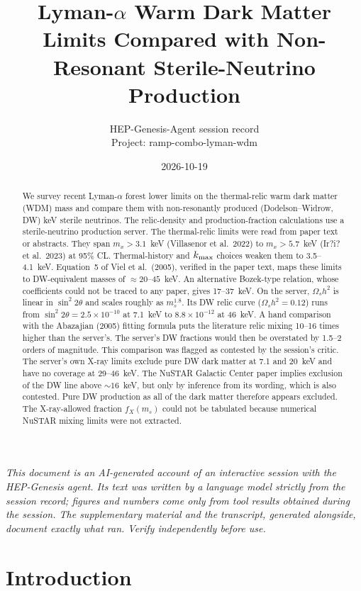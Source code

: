 \documentclass[11pt,a4paper]{article}
\title{Lyman-$\alpha$ Warm Dark Matter Limits Compared with Non-Resonant Sterile-Neutrino Production}
\author{HEP-Genesis-Agent session record \\ \small Project: ramp-combo-lyman-wdm}
\date{2026-10-19}
\begin{document}
\maketitle
\noindent\textit{\small This document is an AI-generated account of an interactive session with the HEP-Genesis agent. Its text was written by a language model strictly from the session record; figures and numbers come only from tool results obtained during the session. The supplementary material and the transcript, generated alongside, document exactly what ran. Verify independently before use.}
\vspace{1em}

\begin{abstract}
We survey recent Lyman-$\alpha$ forest lower limits on the thermal-relic warm dark matter (WDM) mass and compare them with non-resonantly produced (Dodelson--Widrow, DW) keV sterile neutrinos. The relic-density and production-fraction calculations use a sterile-neutrino production server. The thermal-relic limits were read from paper text or abstracts. They span $m_x>3.1$~keV (Villasenor et al.\ 2022) to $m_x>5.7$~keV (Ir?i? et al.\ 2023) at 95\% CL. Thermal-history and $k_{\rm max}$ choices weaken them to 3.5--4.1~keV. Equation~5 of Viel et al.\ (2005), verified in the paper text, maps these limits to DW-equivalent masses of $\approx 20$--$45$~keV. An alternative Bozek-type relation, whose coefficients could not be traced to any paper, gives 17--37~keV. On the server, $\Omega_s h^2$ is linear in $\sin^2 2\theta$ and scales roughly as $m_s^{1.8}$. Its DW relic curve ($\Omega_s h^2=0.12$) runs from $\sin^2 2\theta = 2.5\times10^{-10}$ at 7.1~keV to $8.8\times10^{-12}$ at 46~keV. A hand comparison with the Abazajian (2005) fitting formula puts the literature relic mixing 10--16 times higher than the server's. The server's DW fractions would then be overstated by 1.5--2 orders of magnitude. This comparison was flagged as contested by the session's critic. The server's own X-ray limits exclude pure DW dark matter at 7.1 and 20~keV and have no coverage at 29--46~keV. The NuSTAR Galactic Center paper implies exclusion of the DW line above $\sim16$~keV, but only by inference from its wording, which is also contested. Pure DW production as all of the dark matter therefore appears excluded. The X-ray-allowed fraction $f_X(m_s)$ could not be tabulated because numerical NuSTAR mixing limits were not extracted.
\end{abstract}

\section{Introduction}
\end{document}

